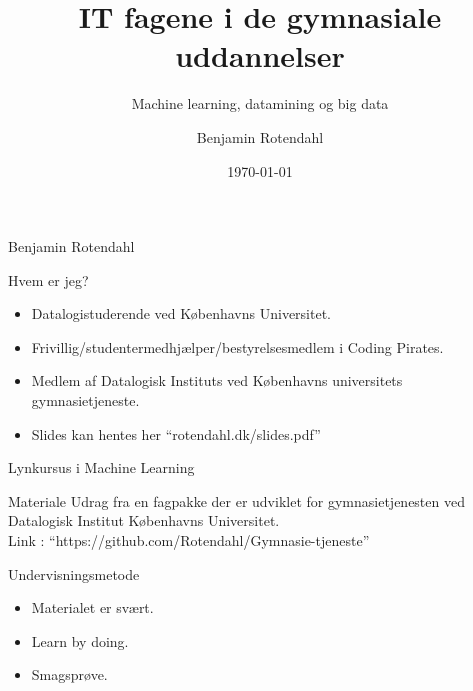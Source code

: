 \documentclass[12pt,t]{beamer}
\title{IT fagene i de gymnasiale uddannelser}
\subtitle{Machine learning, datamining og big data}
\author{
        Benjamin Rotendahl
}
\date[]{\today}
\begin{document}
\frame{\titlepage}

\begin{frame}[c]{Benjamin Rotendahl}
    \begin{block}{Hvem er jeg?}
        \begin{itemize}
            \item Datalogistuderende ved Københavns Universitet. \pause
            \item Frivillig/studentermedhjælper/bestyrelsesmedlem i  Coding
                  Pirates. \pause
            \item Medlem af Datalogisk Instituts ved Københavns universitets
                  gymnasietjeneste.\pause
            \item Slides kan hentes her ``rotendahl.dk/slides.pdf'' \pause
        \end{itemize}
    \end{block}
\end{frame}

\begin{frame}[c]{Lynkursus i Machine Learning}
        \begin{block}{Materiale}
            Udrag fra en fagpakke der er udviklet for gymnasietjenesten ved
            Datalogisk Institut Københavns Universitet.\\
            Link : ``https://github.com/Rotendahl/Gymnasie-tjeneste''
        \end{block}
        \pause
        \begin{block}{Undervisningsmetode}
            \begin{itemize}
                \item Materialet er svært. \pause
                \item Learn by doing. \pause
                \item Smagsprøve.
            \end{itemize}
        \end{block}



\end{frame}
\end{document}
